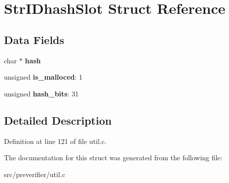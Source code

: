 \section{StrIDhashSlot Struct Reference}
\label{struct_str_i_dhash_slot}
\subsection*{Data Fields}
\begin{DoxyCompactItemize}
\item 
char $\ast$ {\bfseries hash}\label{struct_str_i_dhash_slot_ac4ec7b7f1b2cbce2ffba0ab65412aa25}

\item 
unsigned {\bfseries is\_\-malloced}: 1\label{struct_str_i_dhash_slot_a5b4fbc1ad5cd219a8fbcf196495d07d2}

\item 
unsigned {\bfseries hash\_\-bits}: 31\label{struct_str_i_dhash_slot_af56fe20b7d73060f1cd5688682929b09}

\end{DoxyCompactItemize}


\subsection{Detailed Description}


Definition at line 121 of file util.c.



The documentation for this struct was generated from the following file:\begin{DoxyCompactItemize}
\item 
src/preverifier/util.c\end{DoxyCompactItemize}
